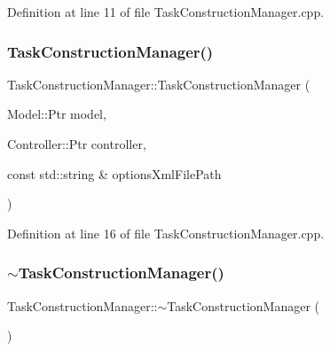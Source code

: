 Definition at line 11 of file Task\+Construction\+Manager.\+cpp.

\hypertarget{classocra_1_1TaskConstructionManager_a946b02d5d8d3a75f927c3b87f3aeea1a}{}\label{classocra_1_1TaskConstructionManager_a946b02d5d8d3a75f927c3b87f3aeea1a} 
\subsubsection{\texorpdfstring{Task\+Construction\+Manager()}{TaskConstructionManager()}\hspace{0.1cm}{\footnotesize\ttfamily [3/3]}}
{\footnotesize\ttfamily Task\+Construction\+Manager\+::\+Task\+Construction\+Manager (\begin{DoxyParamCaption}\item[{Model\+::\+Ptr}]{model,  }\item[{Controller\+::\+Ptr}]{controller,  }\item[{const std\+::string \&}]{options\+Xml\+File\+Path }\end{DoxyParamCaption})}



Definition at line 16 of file Task\+Construction\+Manager.\+cpp.

\hypertarget{classocra_1_1TaskConstructionManager_a6a12b900d600357c304cd445674a3004}{}\label{classocra_1_1TaskConstructionManager_a6a12b900d600357c304cd445674a3004} 
\subsubsection{\texorpdfstring{$\sim$\+Task\+Construction\+Manager()}{~TaskConstructionManager()}}
{\footnotesize\ttfamily Task\+Construction\+Manager\+::$\sim$\+Task\+Construction\+Manager (\begin{DoxyParamCaption}{ }\end{DoxyParamCaption})\hspace{0.3cm}{\ttfamily [virtual]}}



